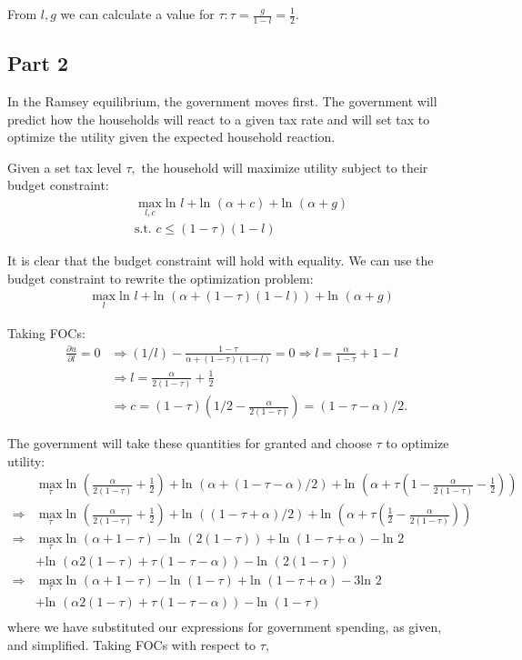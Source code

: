\documentclass[11pt]{article} %
\begin{document}
From $l,g$ we can calculate a value for $\tau: \tau = \frac{g}{1-l} = \frac{1}{2}.$

\subsection{Part 2}
In the Ramsey equilibrium, the government moves first. The government will predict how the households will react to a given tax rate and will set tax to optimize the utility given the expected household reaction. 

Given a set tax level $\tau,$ the household will maximize utility subject to their budget constraint:
\begin{align*}
&\max_{l,c} \text{ln }l +\text{ln }(\alpha + c) +\text{ln }(\alpha + g)\\
&\text{s.t. } c \leq (1-\tau)(1-l)
\end{align*}

It is clear that the budget constraint will hold with equality. We can use the budget constraint to rewrite the optimization problem:
\begin{align*}
&\max_{l} \text{ln }l +\text{ln }(\alpha + (1-\tau)(1-l)) +\text{ln }(\alpha + g)
\end{align*}

Taking FOCs:
\begin{align*}
\frac{\partial u}{\partial l} = 0 &\Rightarrow (1/l) - \frac{1-\tau}{\alpha + (1-\tau)(1-l)} = 0 \Rightarrow l = \frac{\alpha}{1-\tau} +1 - l \\
&\Rightarrow l = \frac{\alpha}{2(1-\tau)} + \frac{1}{2}\\
&\Rightarrow c = (1-\tau)\left(1/2 -\frac{\alpha}{2(1-\tau)}  \right) = (1-\tau - \alpha)/2.
\end{align*}

The government will take these quantities for granted and choose $\tau$ to optimize utility:
\begin{align*}
&\max_{\tau} \text{ln }\left(\frac{\alpha}{2(1-\tau)} + \frac{1}{2}\right) +\text{ln }\left(\alpha + (1-\tau - \alpha)/2\right) +\text{ln }\left(\alpha + \tau\left(1- \frac{\alpha}{2(1-\tau)} - \frac{1}{2} \right)\right)\\
\Rightarrow &\max_{\tau}  \text{ln }\left(\frac{\alpha}{2(1-\tau)} + \frac{1}{2}\right) +\text{ln }\left( (1-\tau + \alpha)/2\right) +\text{ln }\left(\alpha + \tau\left(\frac{1}{2}- \frac{\alpha}{2(1-\tau)} \right)\right)\\
\Rightarrow &\max_{\tau}  \text{ln } (\alpha +1 - \tau) - \text{ln } (2(1-\tau)) + \text{ln }(1-\tau+\alpha) - \text{ln }2 \\&+ \text{ln }(\alpha 2(1-\tau) + \tau (1-\tau - \alpha)) - \text{ln }(2(1-\tau))\\
\Rightarrow &\max_{\tau}  \text{ln } (\alpha +1 - \tau) - \text{ln } (1-\tau) + \text{ln }(1-\tau+\alpha) - 3\text{ln }2 \\&+ \text{ln }(\alpha 2(1-\tau) + \tau (1-\tau - \alpha)) - \text{ln }(1-\tau)\\
\end{align*}
where we have substituted our expressions for government spending, as given, and simplified. Taking FOCs with respect to $\tau$,
\end{document}
